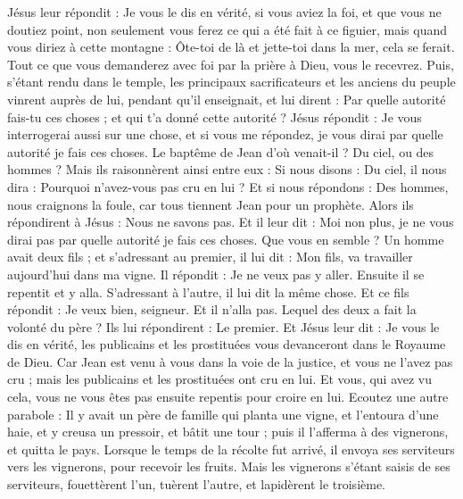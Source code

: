 \begin{multicols}{2}
Jésus leur répondit : Je vous le dis en vérité, si vous aviez la foi, et que vous ne doutiez point, non seulement vous ferez ce qui a été fait à ce figuier, mais quand vous diriez à cette montagne : Ôte-toi de là et jette-toi dans la mer, cela se ferait.
Tout ce que vous demanderez avec foi par la prière à Dieu, vous le recevrez.
Puis, s’étant rendu dans le temple, les principaux sacrificateurs et les anciens du peuple vinrent auprès de lui, pendant qu’il enseignait, et lui dirent : Par quelle autorité fais-tu ces choses ; et qui t'a donné cette autorité ?
Jésus répondit : Je vous interrogerai aussi sur une chose, et si vous me répondez, je vous dirai par quelle autorité je fais ces choses.
Le baptême de Jean d'où venait-il ? Du ciel, ou des hommes ? Mais ils raisonnèrent ainsi entre eux : Si nous disons : Du ciel, il nous dira : Pourquoi n’avez-vous pas cru en lui ?
Et si nous répondons : Des hommes, nous craignons la foule, car tous tiennent Jean pour un prophète.
Alors ils répondirent à Jésus : Nous ne savons pas. Et il leur dit : Moi non plus, je ne vous dirai pas par quelle autorité je fais ces choses.
Que vous en semble ? Un homme avait deux fils ; et s’adressant au premier, il lui dit : Mon fils, va travailler aujourd'hui dans ma vigne.
Il répondit : Je ne veux pas y aller. Ensuite il se repentit et y alla.
S’adressant à l’autre, il lui dit la même chose. Et ce fils répondit : Je veux bien, seigneur. Et il n’alla pas.
Lequel des deux a fait la volonté du père ? Ils lui répondirent : Le premier. Et Jésus leur dit : Je vous le dis en vérité, les publicains et les prostituées vous devanceront dans le Royaume de Dieu.
Car Jean est venu à vous dans la voie de la justice, et vous ne l'avez pas cru ; mais les publicains et les prostituées ont cru en lui. Et vous, qui avez vu cela, vous ne vous êtes pas ensuite repentis pour croire en lui.
Ecoutez une autre parabole : Il y avait un père de famille qui planta une vigne, et l’entoura d'une haie, et y creusa un pressoir, et bâtit une tour ; puis il l’afferma à des vignerons, et quitta le pays.
Lorsque le temps de la récolte fut arrivé, il envoya ses serviteurs vers les vignerons, pour recevoir les fruits.
Mais les vignerons s’étant saisis de ses serviteurs, fouettèrent l'un, tuèrent l'autre, et lapidèrent le troisième.

\end{multicols}

